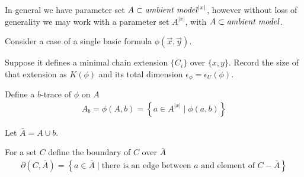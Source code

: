 \documentclass{amsart}
\newcommand{\curly}[1]{\left\{#1\right\}}
\begin{document}



%



In general we have parameter set $A \subset \text{\textit{ambient model}}^{|x|}$, however without loss of generality we may work with
a parameter set $A^{|x|}$, with $A \subset \text{\textit{ambient model}}$.

Consider a case of a single basic formula $\phi(\vec x, \vec y)$.

Suppose it defines a minimal chain extension $\{C_i\}$ over $\{x, y\}$. 
Record the size of that extension as $K(\phi)$ and its total dimension $\epsilon_\phi = \epsilon_U(\phi)$.

\begin{Definition}
	Define a $b$-trace of $\phi$ on $A$
	\begin{align*}
		A_b = \phi(A, b) = \curly{a \in A^{|x|} \mid \phi(a, b)}
	\end{align*}
\end{Definition}

Let $\bar A = A \cup b$.

\begin{Definition}
	For a set $C$ define the boundary of $C$ over $\bar A$
	\begin{align*}
		\partial(C, \bar A) = \curly{a \in \bar A \mid \text{there is an edge between $a$ and element of $C - \bar A$}}
	\end{align*}
\end{Definition}
\end{document}
